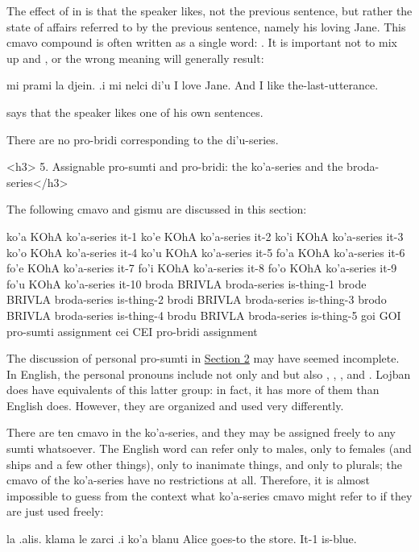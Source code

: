 The effect of  in 
    is that the speaker likes, not the previous sentence, but
    rather the state of affairs referred to by the previous
    sentence, namely his loving Jane. This cmavo compound is often
    written as a single word: . It is important not to
    mix up  and , or the wrong meaning will
    generally result:
\begin{example}
mi prami la djein.\n
\T	.i mi nelci di'u\n
I love Jane.\n
\T	And I like the-last-utterance.
\end{example}

{\noindent}says that the speaker likes one of his own sentences. 

There are no pro-bridi corresponding to the di'u-series.

<h3>
5. Assignable pro-sumti and pro-bridi: the ko'a-series and
    the broda-series</h3>

The following cmavo and gismu are discussed in this
    section:

   ko'a    KOhA    ko'a-series it-1
    ko'e    KOhA    ko'a-series it-2
    ko'i    KOhA    ko'a-series it-3
    ko'o    KOhA    ko'a-series it-4
    ko'u    KOhA    ko'a-series it-5
    fo'a    KOhA    ko'a-series it-6
    fo'e    KOhA    ko'a-series it-7
    fo'i    KOhA    ko'a-series it-8
    fo'o    KOhA    ko'a-series it-9
    fo'u    KOhA    ko'a-series it-10
    broda   BRIVLA  broda-series    is-thing-1
    brode   BRIVLA  broda-series    is-thing-2
    brodi   BRIVLA  broda-series    is-thing-3
    brodo   BRIVLA  broda-series    is-thing-4
    brodu   BRIVLA  broda-series    is-thing-5
    goi GOI         pro-sumti assignment
    cei CEI         pro-bridi assignment

The discussion of personal pro-sumti in \hyperref[sec:7:2]{Section
    2} may have seemed incomplete. In English, the personal
    pronouns include not only  and  but also ,
    , , and . Lojban does have equivalents of
    this latter group: in fact, it has more of them than English
    does. However, they are organized and used very differently. 

There are ten cmavo in the ko'a-series, and they may be
    assigned freely to any sumti whatsoever. The English word
     can refer only to males,  only to females (and
    ships and a few other things),  only to inanimate things,
    and  only to plurals; the cmavo of the ko'a-series have
    no restrictions at all. Therefore, it is almost impossible to
    guess from the context what ko'a-series cmavo might refer to if
    they are just used freely:
\begin{example}
la .alis. klama le zarci .i ko'a blanu\n
Alice goes-to the store.  It-1 is-blue.
\end{example}

